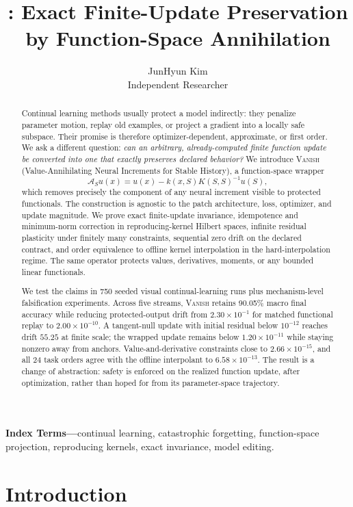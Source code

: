 \documentclass{vanish_ieee}
\title{\VANISH: Exact Finite-Update Preservation\\by Function-Space Annihilation}
\author{JunHyun Kim\\\normalsize Independent Researcher}
\theoremstyle{definition}
\newcommand{\Aop}{\mathcal{A}}
\newcommand{\VANISH}{\textsc{Vanish}}
\begin{document}
\maketitle

\begin{abstract}
Continual learning methods usually protect a model indirectly: they penalize parameter motion, replay old examples, or project a gradient into a locally safe subspace.  Their promise is therefore optimizer-dependent, approximate, or first order.  We ask a different question: \emph{can an arbitrary, already-computed finite function update be converted into one that exactly preserves declared behavior?}  We introduce \VANISH{} (Value-Annihilating Neural Increments for Stable History), a function-space wrapper
\[
\Aop_S u(x)=u(x)-k(x,S)K(S,S)^{-1}u(S),
\]
which removes precisely the component of any neural increment visible to protected functionals.  The construction is agnostic to the patch architecture, loss, optimizer, and update magnitude.  We prove exact finite-update invariance, idempotence and minimum-norm correction in reproducing-kernel Hilbert spaces, infinite residual plasticity under finitely many constraints, sequential zero drift on the declared contract, and order equivalence to offline kernel interpolation in the hard-interpolation regime.  The same operator protects values, derivatives, moments, or any bounded linear functionals.

We test the claims in 750 seeded visual continual-learning runs plus mechanism-level falsification experiments.  Across five streams, \VANISH{} retains 90.05\% macro final accuracy while reducing protected-output drift from $2.30\times10^{-1}$ for matched functional replay to $2.00\times10^{-10}$.  A tangent-null update with initial residual below $10^{-12}$ reaches drift $55.25$ at finite scale; the wrapped update remains below $1.20\times10^{-11}$ while staying nonzero away from anchors.  Value-and-derivative constraints close to $2.66\times10^{-15}$, and all 24 task orders agree with the offline interpolant to $6.58\times10^{-13}$.  The result is a change of abstraction: safety is enforced on the realized function update, after optimization, rather than hoped for from its parameter-space trajectory.
\end{abstract}

\noindent\textbf{Index Terms---}continual learning, catastrophic forgetting, function-space projection, reproducing kernels, exact invariance, model editing.

\section{Introduction}
\end{document}
